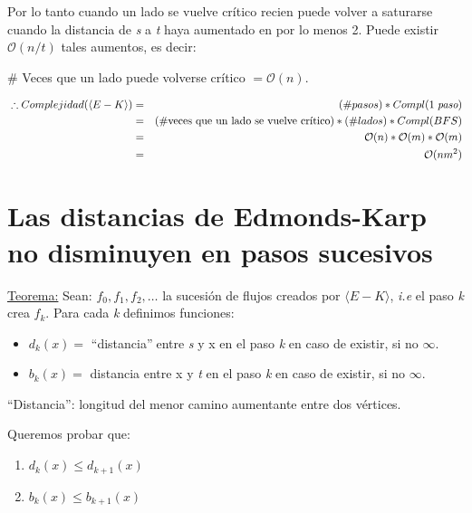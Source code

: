 \documentclass[12pt,a4paper]{report}
\begin{document}
		\vspace{5mm}
		Por lo tanto cuando un lado se vuelve crítico recien puede volver a saturarse cuando la distancia de \textit{s} a \textit{t} haya aumentado en por lo menos 2. Puede existir $\mathcal{O}(n/t)$ tales aumentos, es decir:
		
		\begin{center}
			\# Veces que un lado puede volverse crítico $= \mathcal{O}(n)$. 
		\end{center}				
		
		\begin{eqnarray}
			 \nonumber \; \therefore Complejidad(\langle E-K \rangle) &=& (\# pasos) * Compl(1 \; \textit{paso}) \\
			 \nonumber &=& (\# \textup{veces que un lado se vuelve crítico}) * (\# lados) * Compl(BFS) \\
			\nonumber  &=& \mathcal{O}(n) * \mathcal{O}(m)* \mathcal{O}(m) \\
			\nonumber &=& \mathcal{O}(nm^{2})
		\end{eqnarray}
			
		
	\section{Las distancias de Edmonds-Karp no disminuyen en pasos sucesivos}
		\underline{Teorema:} Sean: $f_{0}, f_{1}, f_{2}, \dotsc$ \;  la sucesión de flujos creados por $\langle E-K \rangle$, \textit{i.e} el paso \textit{k} crea $f_{k}$. Para cada \textit{k} definimos funciones:
		
		\begin{itemize}
			\item $d_{k}(x) =$ \textquotedblleft distancia\textquotedblright$\;$entre \textit{s} y x en el paso \textit{k} en caso de existir, si no $\infty$.
			\item $b_{k}(x) =$ distancia entre x y \textit{t} en el paso \textit{k} en caso de existir, si no $\infty$.
		\end{itemize}
	
		\textquotedblleft Distancia\textquotedblright: longitud del menor camino aumentante entre dos vértices.
		
		\vspace{5mm}
		Queremos probar que:
		\begin{enumerate}
			\item $d_{k}(x) \leq d_{k+1}(x)$
			\item $b_{k}(x) \leq b_{k+1}(x)$
		\end{enumerate}
		
\end{document}
